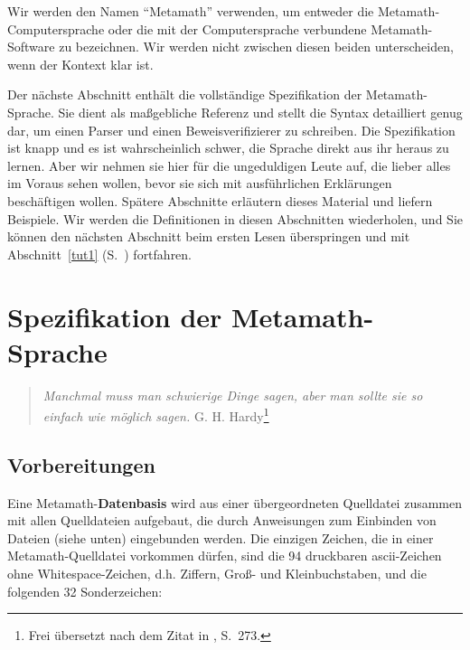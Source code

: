 Wir werden den Namen "`Metamath"' verwenden, um entweder die Meta\-math-Computersprache oder die mit der Computersprache verbundene Meta\-math-Software zu bezeichnen.  Wir werden nicht zwischen diesen beiden unterscheiden, wenn der Kontext klar ist.

Der nächste Abschnitt enthält die vollständige Spezifikation der Metamath-Sprache. Sie dient als maßgebliche Referenz und stellt die Syntax detailliert genug dar, um einen Parser und einen Beweisverifizierer zu schreiben.  Die Spezifikation ist knapp und es ist wahrscheinlich schwer, die Sprache direkt aus ihr heraus zu lernen. Aber wir nehmen sie hier für die ungeduldigen Leute auf, die lieber alles im Voraus sehen wollen, bevor sie sich mit ausführlichen Erklärungen beschäftigen wollen.  Spätere Abschnitte erläutern dieses Material und liefern Beispiele. Wir werden die Definitionen in diesen Abschnitten wiederholen, und Sie können den nächsten Abschnitt beim ersten Lesen überspringen und mit Abschnitt~\ref{tut1} (S.~\pageref{tut1}) fortfahren.

\section{Spezifikation der Metamath-Sprache}\label{spec}

\begin{quote}
  {\em Manchmal muss man schwierige Dinge sagen, aber man sollte sie so einfach wie möglich sagen.}
    \flushright\sc  G. H. Hardy\footnote{Frei übersetzt nach dem Zitat in \cite{deMillo}, S.~273.}\\
\end{quote}

\subsection{Vorbereitungen}\label{spec1}

Eine Metamath-{\bf Datenbasis} wird aus einer übergeordneten Quelldatei zusammen mit allen Quelldateien aufgebaut, die durch Anweisungen zum Einbinden von Dateien (siehe unten) eingebunden werden.  Die einzigen Zeichen, die in einer Metamath-Quelldatei vorkommen dürfen, sind die 94 druckbaren {\sc ascii}-Zeichen ohne Whitespace-Zeichen, d.h. Ziffern, Groß- und Kleinbuchstaben, und die folgenden 32 Sonderzeichen:\label{spec1chars}

